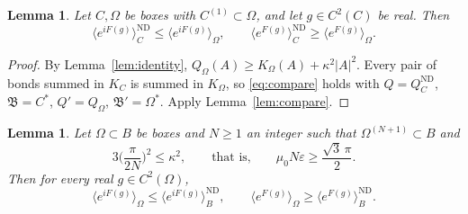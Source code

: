 \documentclass[11pt]{amsart}
\theoremstyle{plain}
\newtheorem{lemma}[theorem]{Lemma}
\theoremstyle{definition}
\theoremstyle{remark}
\numberwithin{equation}{section}
\newcommand{\eps}{\varepsilon}
\newcommand{\fB}{\mathfrak{B}}
\newcommand{\abs}[1]{\lvert #1\rvert}
\newcommand{\ev}[1]{\langle #1\rangle}
\begin{document}
\begin{lemma}\label{lem:lower}
Let $C,\Omega$ be boxes with $C^{(1)}\subset\Omega$, and let $g\in C^2(C)$ be real. Then
\[
\ev{e^{iF(g)}}^{\mathrm{ND}}_C\le\ev{e^{iF(g)}}_\Omega,\qquad\ev{e^{F(g)}}^{\mathrm{ND}}_C\ge\ev{e^{F(g)}}_\Omega .
\]
\end{lemma}

\begin{proof}
By Lemma~\ref{lem:identity}, $Q_\Omega(A)\ge K_\Omega(A)+\kappa^2\abs A^2$. Every pair of bonds summed in $K_C$ is summed in $K_\Omega$, so \eqref{eq:compare} holds with $Q=Q^{\mathrm{ND}}_C$, $\fB=C^*$, $Q'=Q_\Omega$, $\fB'=\Omega^*$. Apply Lemma~\ref{lem:compare}.
\end{proof}

\begin{lemma}\label{lem:upper}
Let $\Omega\subset B$ be boxes and $N\ge1$ an integer such that $\Omega^{(N+1)}\subset B$ and
\begin{equation}\label{eq:margin}
3\Big(\frac{\pi}{2N}\Big)^2\le\kappa^2,\qquad\text{that is,}\qquad\mu_0N\eps\ge\frac{\sqrt3\,\pi}{2}.
\end{equation}
Then for every real $g\in C^2(\Omega)$,
\[
\ev{e^{iF(g)}}_\Omega\le\ev{e^{iF(g)}}^{\mathrm{ND}}_B,\qquad\ev{e^{F(g)}}_\Omega\ge\ev{e^{F(g)}}^{\mathrm{ND}}_B .
\]
\end{lemma}
\end{document}
